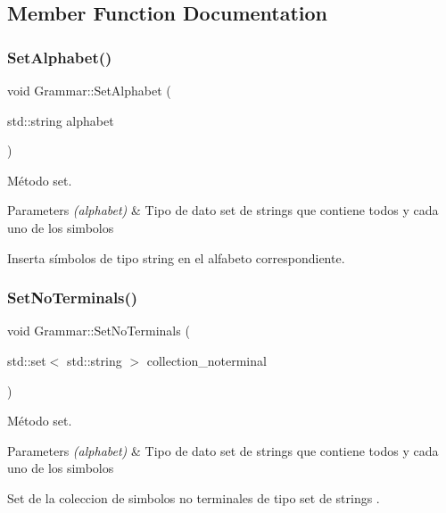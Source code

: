 \subsection{Member Function Documentation}
\mbox{\label{classGrammar_abd0efb1c23b6c09443b996adbb2d82be}} 
\subsubsection{\texorpdfstring{Set\+Alphabet()}{SetAlphabet()}}
{\footnotesize\ttfamily void Grammar\+::\+Set\+Alphabet (\begin{DoxyParamCaption}\item[{std\+::string}]{alphabet }\end{DoxyParamCaption})}



Método set. 


\begin{DoxyParams}{Parameters}
{\em (alphabet)} & Tipo de dato set de strings que contiene todos y cada uno de los simbolos\\
\hline
\end{DoxyParams}
Inserta símbolos de tipo string en el alfabeto correspondiente. \mbox{\label{classGrammar_af8f0dda3f50275d6dac186d6579e9d23}} 
\subsubsection{\texorpdfstring{Set\+No\+Terminals()}{SetNoTerminals()}}
{\footnotesize\ttfamily void Grammar\+::\+Set\+No\+Terminals (\begin{DoxyParamCaption}\item[{std\+::set$<$ std\+::string $>$}]{collection\+\_\+noterminal }\end{DoxyParamCaption})}



Método set. 


\begin{DoxyParams}{Parameters}
{\em (alphabet)} & Tipo de dato set de strings que contiene todos y cada uno de los simbolos\\
\hline
\end{DoxyParams}
Set de la coleccion de simbolos no terminales de tipo set de strings . \mbox{\label{classGrammar_a1b8915ce3d5677b2bf7272dd59b89512}} 
